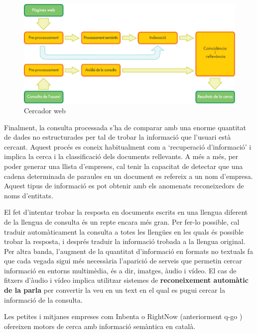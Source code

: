 \begin{multicols}{2}
\begin{figure}[htb]
  \vspace{-9mm}
  \center
  \includegraphics[width=\textwidth]{../_media/catalan/web_search_architecture}
  \vspace{-5mm}
  \caption{Cercador web}
  \label{fig:websearcharch_ca}
\end{figure}

Finalment, la consulta processada s’ha de comparar amb una enorme quantitat de dades no estructurades per tal de trobar la informació que l'usuari està cercant. Aquest procés es coneix habitualment com a ‘recuperació d'informació’ i implica la cerca i la classificació dels documents rellevants. A més a més, per poder generar una llista d’empreses, cal tenir la capacitat de detectar que una cadena determinada de paraules en un document es refereix a un nom d'empresa. Aquest tipus de informació es pot obtenir amb els anomenats reconeixedors de noms d’entitats.

El fet d’intentar trobar la resposta en documents escrits en una llengua diferent de la llengua de consulta és un repte encara més gran. Per fer-lo possible, cal traduir automàticament la consulta a totes les llengües en les quals és possible trobar la resposta, i després traduir la informació trobada a la llengua original. Per altra banda, l’augment de la quantitat d’informació en formats no textuals fa que cada vegada sigui més necessària l’aparició de serveis que permetin cercar informació en entorns multimèdia, és a dir, imatges, àudio i vídeo. El cas de fitxers d’àudio i vídeo implica utilitzar sistemes de \textbf{reconeixement automàtic de la parla} per convertir la veu en un text en el qual es pugui cercar la informació de la consulta. 

Les petites i mitjanes empreses com Inbenta \cite{CAT-inbenta} o RightNow  (anteriorment q-go \cite{CAT-rightnow}) ofereixen motors de cerca amb informació semàntica en català.


\end{multicols}
